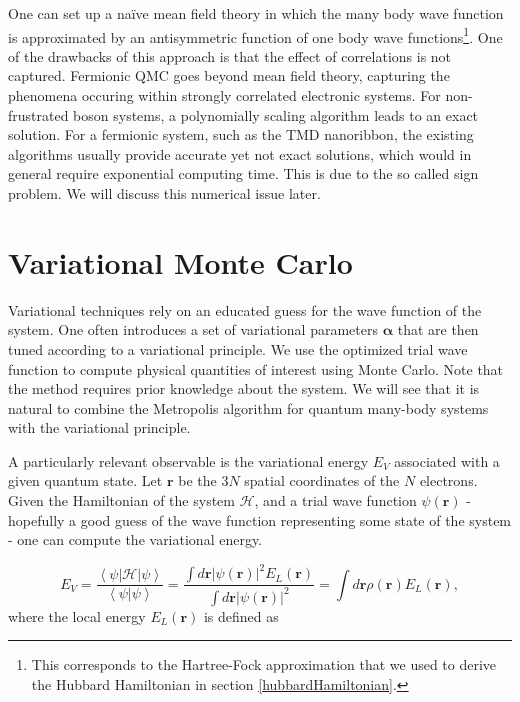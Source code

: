 One can set up a na\"ive mean field theory in which the many body wave function is approximated by an antisymmetric function of one body wave functions\footnote{This corresponds to the Hartree-Fock approximation that we used to derive the Hubbard Hamiltonian in section \ref{hubbardHamiltonian}.}. One of the drawbacks of this approach is that the effect of  correlations is not captured. Fermionic QMC goes beyond mean field theory,  capturing the phenomena occuring within strongly correlated electronic systems. For non-frustrated boson systems, a polynomially scaling algorithm leads to an exact solution. For a fermionic system, such as the TMD nanoribbon, the existing algorithms usually provide accurate yet not exact solutions, which would in general require exponential computing time. This is due to the so called sign problem. We will discuss this numerical issue later.

\section{Variational Monte Carlo}

Variational techniques rely on an educated guess for the wave function of the system. One often introduces a set of variational parameters $\bm \alpha$ that are then tuned according to a variational principle. We use the optimized trial wave function to compute physical quantities of interest using Monte Carlo. Note that the method requires  prior knowledge about the system. We will see that it is natural to combine the Metropolis algorithm for quantum many-body systems with the variational principle.

A particularly relevant observable is the variational energy $E_V$ associated with a given quantum state. Let $\bm r$ be the $3N$ spatial coordinates of the $N$ electrons. Given the Hamiltonian of the system $\mathcal{H}$, and a trial wave function $\psi (\bm r)$ - hopefully a good guess of the wave function representing some state of the system - one can compute the variational energy.

\begin{equation}\label{eq:variational_energy}
E_V = \frac{\left\langle \psi | \mathcal{H} | \psi \right \rangle}{\left\langle \psi | \psi \right \rangle} = \frac{ \int d\bm r |\psi (\bm r)|^2 E_L (\bm r)}{\int d\bm r | \psi (\bm r)|^2 } = \int d\bm r\rho (\bm r) E_L (\bm r) ,
\end{equation}
where the local energy $E_L (\bm r)$ is defined as

